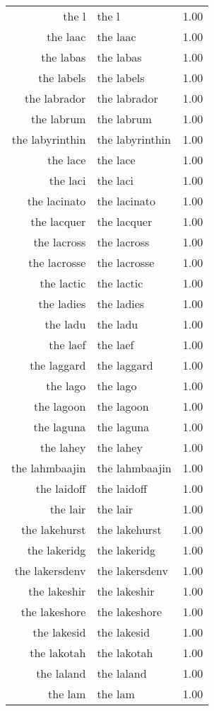\begin{table}[ht]
\begin{tabular}{rlr}
  the l & the l & 1.00 \\ 
  the laac & the laac & 1.00 \\ 
  the labas & the labas & 1.00 \\ 
  the labels & the labels & 1.00 \\ 
  the labrador & the labrador & 1.00 \\ 
  the labrum & the labrum & 1.00 \\ 
  the labyrinthin & the labyrinthin & 1.00 \\ 
  the lace & the lace & 1.00 \\ 
  the laci & the laci & 1.00 \\ 
  the lacinato & the lacinato & 1.00 \\ 
  the lacquer & the lacquer & 1.00 \\ 
  the lacross & the lacross & 1.00 \\ 
  the lacrosse & the lacrosse & 1.00 \\ 
  the lactic & the lactic & 1.00 \\ 
  the ladies & the ladies & 1.00 \\ 
  the ladu & the ladu & 1.00 \\ 
  the laef & the laef & 1.00 \\ 
  the laggard & the laggard & 1.00 \\ 
  the lago & the lago & 1.00 \\ 
  the lagoon & the lagoon & 1.00 \\ 
  the laguna & the laguna & 1.00 \\ 
  the lahey & the lahey & 1.00 \\ 
  the lahmbaajin & the lahmbaajin & 1.00 \\ 
  the laidoff & the laidoff & 1.00 \\ 
  the lair & the lair & 1.00 \\ 
  the lakehurst & the lakehurst & 1.00 \\ 
  the lakeridg & the lakeridg & 1.00 \\ 
  the lakersdenv & the lakersdenv & 1.00 \\ 
  the lakeshir & the lakeshir & 1.00 \\ 
  the lakeshore & the lakeshore & 1.00 \\ 
  the lakesid & the lakesid & 1.00 \\ 
  the lakotah & the lakotah & 1.00 \\ 
  the laland & the laland & 1.00 \\ 
  the lam & the lam & 1.00 \\ 

\end{tabular}
\end{table}
